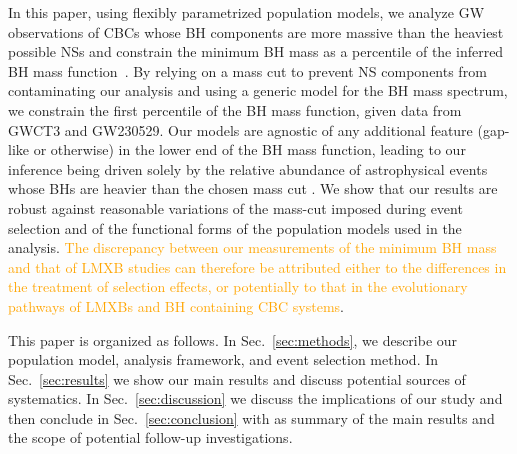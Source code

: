 \documentclass[modern]{aastex631}
\begin{document}
In this paper, using flexibly parametrized population models, we analyze GW
observations of CBCs whose BH components are more massive than the heaviest
possible NSs and constrain the minimum BH mass as a percentile of the inferred
BH mass function~\citep{Farr:2010tu}.  By relying on a mass cut to prevent NS
components from contaminating our analysis and using a generic model for the BH
mass spectrum, we constrain the first percentile of the BH mass function, given
data from GWCT3 and GW230529.  Our models are agnostic of any additional feature (gap-like
or otherwise) in the lower end of the BH mass function, leading to our inference
being driven solely by the relative abundance of astrophysical events whose BHs
are heavier than the chosen mass cut . We show that our results are robust against reasonable variations of
the mass-cut imposed during event selection and of the functional forms of the
population models used in the analysis. \textcolor{orange}{The discrepancy
between our measurements of the minimum BH mass and that of LMXB studies can
therefore be attributed either to the differences in the treatment of selection
effects, or potentially to that in the evolutionary pathways of LMXBs and BH
containing CBC systems}. 


This paper is organized as follows. In Sec.~\ref{sec:methods}, we describe our population model, analysis framework, and event selection method. In Sec.~\ref{sec:results} we show our main results and discuss potential sources of systematics. In Sec.~\ref{sec:discussion} we discuss the implications of our study and then conclude in Sec.~\ref{sec:conclusion} with as summary of the main results and the scope of potential follow-up investigations.
\end{document}
